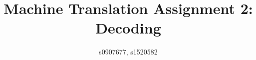 \documentclass[11pt,a4paper]{article}
\title{Machine Translation Assignment 2: Decoding} %
\author{s0907677, s1520582} %
\date{}
\begin{document}
\maketitle %




\pagebreak{}









\end{document}
